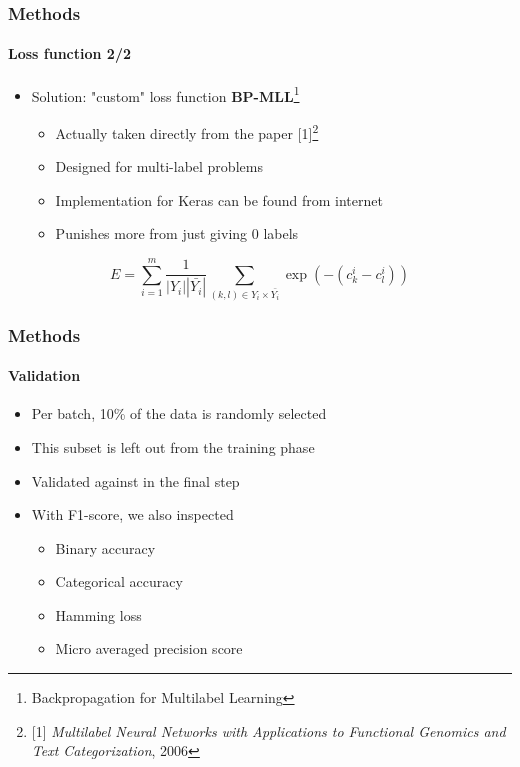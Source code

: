 \begin{frame}
	\frametitle{Methods}
	\framesubtitle{Loss function 2/2}
	\begin{itemize}
				\item Solution: "custom" loss function \textbf{BP-MLL}\footnote{Backpropagation for Multilabel Learning}
		\begin{itemize}
			\item Actually taken directly from the paper [1]\footnote{[1] \emph{Multilabel Neural Networks with Applications to Functional Genomics and Text Categorization}, 2006}
			\item Designed for multi-label problems
			\item Implementation for Keras can be found from internet
			\item Punishes more from just giving 0 labels
		\end{itemize}
	\end{itemize}
	\begin{block}{}
			$$ E =  \sum_{i=1}^{m} \dfrac{1}{|Y_i||\bar{Y_i}|} \sum_{(k,l) \in Y_i \times \bar{Y_i}} \exp(-(c_k^i -c_l^i))$$
	\end{block}	
\end{frame}

\begin{frame}
	\frametitle{Methods}
	\framesubtitle{Validation}
	\begin{itemize}
		\item Per batch, 10\% of the data is randomly selected
		\item This subset is left out from the training phase
		\item Validated against in the final step
		\item With F1-score, we also inspected
		\begin{itemize}
			\item Binary accuracy
			\item Categorical accuracy
			\item Hamming loss
			\item Micro averaged precision score
		\end{itemize}
	\end{itemize}
\end{frame}
